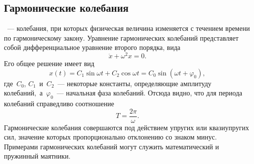 \subsection{Гармонические колебания}
~--- колебания, при которых физическая величина изменяется с течением времени по гармоническому закону. Уравнение гармонических колебаний представляет собой дифференциальное уравнение второго порядка, вида
\begin{equation}
	\ddot{x} + \omega^2 x = 0.
\end{equation}
Его общее решение имеет вид
\begin{equation}
	x(t) = C_1 \sin \omega t + C_2 \cos \omega t = C_0 \sin (\omega t + \varphi_0),
\end{equation}
где~$C_0$, $C_1$~и~$C_2$~--- некоторые константы, определяющие амплитуду колебаний,~а~$\varphi_0$~--- начальная фаза колебаний. Отсюда видно, что для периода колебаний справедливо соотношение
\begin{equation}
	T = \frac{2 \pi}{\omega}.
\end{equation}
Гармонические колебания совершаются под действием упругих или квазиупругих сил, значение которых пропорционально отклонению со знаком минус. Примерами гармонических колебаний могут служить математический и пружинный маятники.
